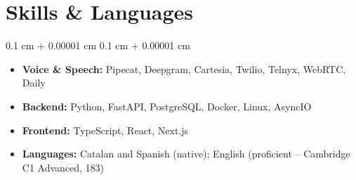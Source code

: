 \documentclass[10pt, letterpaper]{article}
\newenvironment{highlights}{
    \begin{itemize}[
        topsep=0.06 cm,
        parsep=0.06 cm,
        partopsep=0pt,
        itemsep=0pt,
        leftmargin=10pt
    ]
}{
    \end{itemize}
} %
\newenvironment{onecolentry}{
    \begin{adjustwidth}{
        0.1 cm + 0.00001 cm
    }{
        0.1 cm + 0.00001 cm
    }
}{
    \end{adjustwidth}
} %
\newenvironment{entry}{
    \begin{onecolentry}
}{
    \end{onecolentry}
} %
\begin{document}
    \section{Skills \& Languages}
        \begin{entry}
            \begin{highlights}
                \item \textbf{Voice \& Speech:} Pipecat, Deepgram, Cartesia, Twilio, Telnyx, WebRTC, Daily
                \item \textbf{Backend:} Python, FastAPI, PostgreSQL, Docker, Linux, AsyncIO
                \item \textbf{Frontend:} TypeScript, React, Next.js
                \item \textbf{Languages:} Catalan and Spanish (native); English (proficient -- Cambridge C1 Advanced, 183)
            \end{highlights}
        \end{entry}
\end{document}
